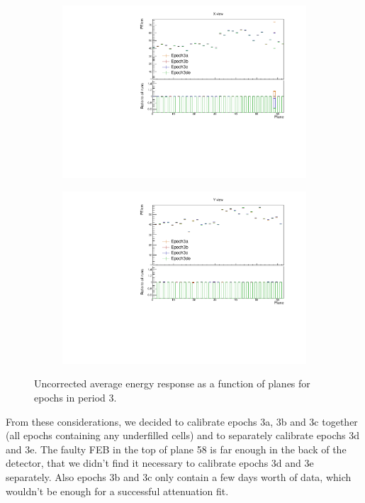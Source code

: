 \documentclass[12pt,a4paper]{article}
\begin{document}
\begin{figure}[!hbtp]
\centering
\begin{subfigure}[b]{0.495\textwidth}
\centering
\includegraphics[width=\textwidth]{Plots/Attenprofs_P3Data_PlanePE_X_Combined.pdf}
\end{subfigure}
\begin{subfigure}[b]{0.495\textwidth}
\centering
\includegraphics[width=\textwidth]{Plots/Attenprofs_P3Data_PlanePE_Y_Combined.pdf}
\end{subfigure}
\caption{Uncorrected average energy response as a function of planes for epochs in period 3.}
\label{figCalibhistPlanePE_period3}
\end{figure}

From these considerations, we decided to calibrate epochs 3a, 3b and 3c together (all epochs containing any underfilled cells) and to separately calibrate epochs 3d and 3e. The faulty FEB in the top of plane 58 is far enough in the back of the detector, that we didn't find it necessary to calibrate epochs 3d and 3e separately. Also epochs 3b and 3c only contain a few days worth of data, which wouldn't be enough for a successful attenuation fit.
\end{document}
